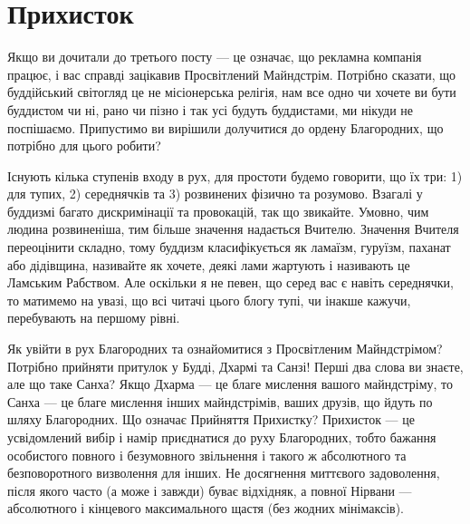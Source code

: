 \section{Прихисток}

Якщо ви дочитали до третього посту --- це означає, що рекламна
компанія працює, і вас справді зацікавив Просвітлений Майндстрім.
Потрібно сказати, що буддійський світогляд це не
місіонерська релігія, нам все одно чи хочете ви бути буддистом
чи ні, рано чи пізно і так усі будуть буддистами, ми нікуди
не поспішаємо. Припустимо ви вирішили долучитися до ордену Благородних,
що потрібно для цього робити?

Існують кілька ступенів входу в рух, для простоти
будемо говорити, що їх три: 1) для тупих, 2) середнячків та 3)
розвинених фізично та розумово. Взагалі у буддизмі багато
дискримінації та провокацій, так що звикайте. Умовно,
чим людина розвиненіша, тим більше значення надається Вчителю.
Значення Вчителя переоцінити складно, тому буддизм
класифікується як ламаїзм, гуруїзм, паханат або дідівщина,
називайте як хочете, деякі лами жартують і називають це
Ламським Рабством. Але оскільки я не певен, що серед вас
є навіть середнячки, то матимемо на увазі, що всі читачі
цього блогу тупі, чи інакше кажучи, перебувають на першому рівні.

Як увійти в рух Благородних та ознайомитися з Просвітленим
Майндстрімом? Потрібно прийняти притулок у Будді, Дхармі та Санзі!
Перші два слова ви знаєте, але що таке Санха? Якщо
Дхарма --- це благе мислення вашого майндстріму, то Санха --- це
благе мислення інших майндстрімів, ваших друзів, що йдуть по
шляху Благородних. Що означає Прийняття Прихистку?
Прихисток --- це усвідомлений вибір і намір приєднатися
до руху Благородних, тобто бажання особистого повного
і безумовного звільнення і такого ж абсолютного та безповоротного
визволення для інших. Не досягнення миттєвого задоволення,
після якого часто (а може і завжди) буває відхідняк,
а повної Нірвани --- абсолютного і кінцевого максимального
щастя (без жодних мінімаксів).

